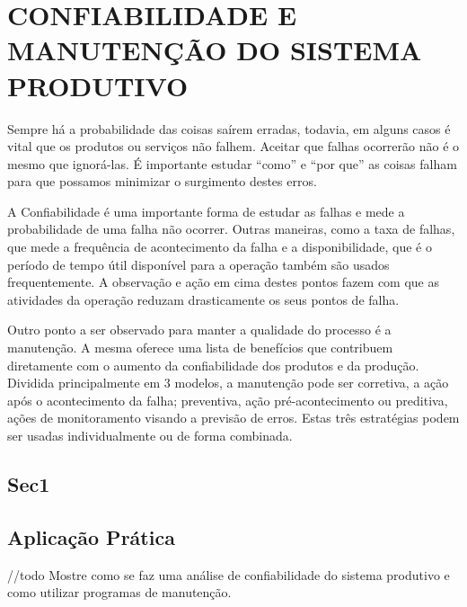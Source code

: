 \chapter{CONFIABILIDADE E MANUTENÇÃO DO SISTEMA PRODUTIVO}
\label{chap:confiabilidade_manutencao_do_sistema_produtivo}
Sempre há a probabilidade das coisas saírem erradas, todavia, em alguns casos é vital que os produtos ou serviços não falhem. Aceitar que falhas ocorrerão não é o mesmo que ignorá-las. É importante estudar ``como'' e ``por que'' as coisas falham para que possamos minimizar o surgimento destes erros.

A Confiabilidade é uma importante forma de estudar as falhas e mede a probabilidade de uma falha não ocorrer. Outras maneiras, como a taxa de falhas, que mede a frequência de acontecimento da falha e a disponibilidade, que é o período de tempo útil disponível para a operação também são usados frequentemente. A observação e ação em cima destes pontos fazem com que as atividades da operação reduzam drasticamente os seus pontos de falha.

Outro ponto a ser observado para manter a qualidade do processo é a manutenção. A mesma oferece uma lista de benefícios que contribuem diretamente com o aumento da confiabilidade dos produtos e da produção. Dividida principalmente em 3 modelos, a manutenção pode ser corretiva, a ação após o acontecimento da falha; preventiva, ação pré-acontecimento ou preditiva, ações de monitoramento visando a previsão de erros. Estas três estratégias podem ser usadas individualmente ou de forma combinada.

\section{Sec1}
\label{sec:confiabilidade_manutencao_sec1}




\section{Aplicação Prática}
\label{sec:confiabilidade_manutencao_aplicacao}
//todo Mostre como se faz uma análise de confiabilidade do sistema produtivo e como utilizar programas de manutenção.